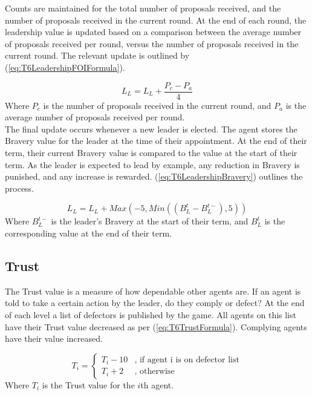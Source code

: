 Counts are maintained for the total number of proposals received, and the number of proposals received in the current round. At the end of each round, the leadership value is updated based on a comparison between the average number of proposals received per round, versus the number of proposals received in the current round. The relevant update is outlined by (\ref{eq:T6LeadershipFOIFormula}).

\begin{equation}\label{eq:T6LeadershipFOIFormula}
    L_{L} = L_{L} + \frac{P_{c}-P_{a}}{4}
\end{equation}
Where $P_{c}$ is the number of proposals received in the current round, and $P_{a}$ is the average number of proposals received per round.\\

The final update occurs whenever a new leader is elected. The agent stores the Bravery value for the leader at the time of their appointment. At the end of their term, their current Bravery value is compared to the value at the start of their term. As the leader is expected to lead by example, any reduction in Bravery is punished, and any increase is rewarded. (\ref{eq:T6LeadershipBravery}) outlines the process.

\begin{equation}\label{eq:T6LeadershipBravery}
    L_{L} = L_{L} + Max(-5,Min((B_{L}^{t}-B_{L}^{t-}),5))
\end{equation}
Where $B_{L}^{t-}$ is the leader's Bravery at the start of their term, and $B_{L}^{t}$ is the corresponding value at the end of their term.

\subsection{Trust}

The Trust value is a measure of how dependable other agents are. If an agent is told to take a certain action by the leader, do they comply or defect? At the end of each level a list of defectors is published by the game. All agents on this list have their Trust value decreased as per (\ref{eq:T6TrustFormula}). Complying agents have their value increased.

\begin{equation}\label{eq:T6TrustFormula}
    T_{i}=\left\{
    	\begin{array}{ll}
    		T_{i}-10 & \mbox{, if agent i is on defector list} \\
    		T_{i}+2  & \mbox{, otherwise} 
    	\end{array}\right.
\end{equation}
Where $T_{i}$ is the Trust value for the $i$th agent.\\

